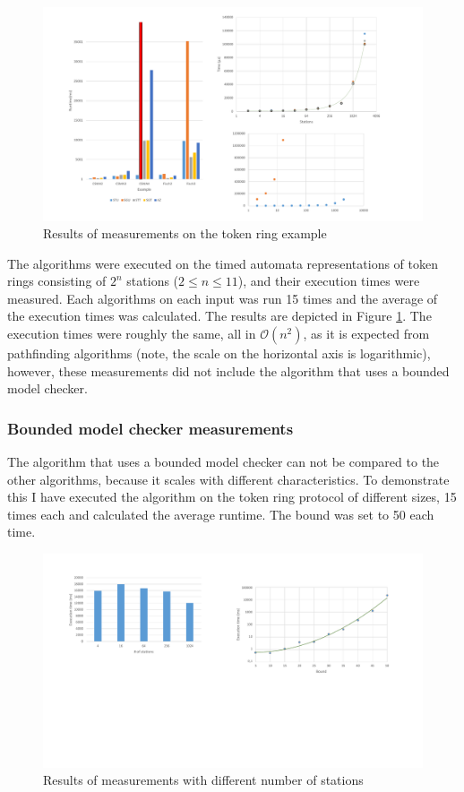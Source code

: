 \begin{figure}
	\centering
	\includegraphics[width=\textwidth]{include/figures/diag_tokenfddi}
	\caption{Results of measurements on the token ring example}
	\label{fig:tokendiag}
\end{figure}

The algorithms were executed on the timed automata representations of token rings consisting of $2^n$ stations ($2 \leq n \leq 11$), and their execution times were measured. Each algorithms on each input was run 15 times and the average of the execution times was calculated. The results are depicted in Figure \ref{fig:tokendiag}. The execution times were roughly the same, all in $\mathcal{O}(n^2)$, as it is expected from pathfinding algorithms (note, the scale on the horizontal axis is logarithmic), however, these measurements did not include the algorithm that uses a bounded model checker.

\subsubsection{Bounded model checker measurements}

The algorithm that uses a bounded model checker can not be compared to the other algorithms, because it scales with different characteristics. To demonstrate this I have executed the algorithm on the token ring protocol of different sizes, 15 times each and calculated the average runtime. The bound was set to 50 each time.

\begin{figure}
	\centering
	\includegraphics[width=\textwidth]{include/figures/diag_bound_station}
	\caption{Results of measurements with different number of stations}
	\label{fig:tokenboundstations}
\end{figure}

